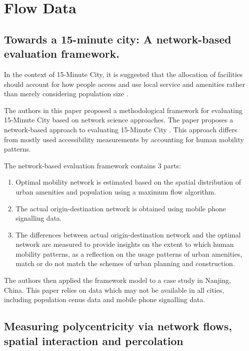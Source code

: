 \section{Flow Data}

\subsection{Towards a 15-minute city: A network-based evaluation framework.} 

In the context of 15-Minute City, it is suggested that the allocation of facilities should account for how people access and use local service and amenities rather than merely considering population size \cite{chai_new_2020}.

The authors in this paper proposed a methodological framework for evaluating 15-Minute City based on network science approaches. The paper proposes a network-based approach to evaluating 15-Minute City \cite{zhang_towards_2023}. This approach differs from mostly used accessibility measurements by accounting for human mobility patterns.

The network-based evaluation framework contains 3 parts:

\begin{enumerate}
    \item Optimal mobility network is estimated based on the spatial distribution of urban amenities and population using a maximum flow algorithm.
    \item The actual origin-destination network is obtained using mobile phone signalling data.
    \item The differences between actual origin-destination network and the optimal network are measured to provide insights on the extent to which human mobility patterns, as a reflection on the usage patterns of urban amenities, match or do not match the schemes of urban planning and construction.
\end{enumerate}

The authors then applied the framework model to a case study in Nanjing, China. This paper relies on data which may not be available in all cities, including population cenus data and mobile phone signalling data.

\subsection{Measuring polycentricity via network flows, spatial interaction and percolation}

